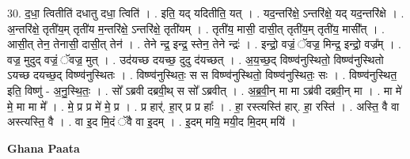 \documentclass[17pt]{extarticle}
\begin{document}
30. द॒धा॒ त्वितीति॑ दधातु दधा॒ त्विति॑ । . इति॒ यद् यदितीति॒ यत् । . यद॒न्तरि॑क्षे॒ ऽन्तरि॑क्षे॒ यद् यद॒न्तरि॑क्षे । . अ॒न्तरि॑क्षे॒ तृती॑य॒म् तृती॑य म॒न्तरि॑क्षे॒ ऽन्तरि॑क्षे॒ तृती॑यम् । . तृती॑य॒ मासी॒ दासी॒त् तृती॑य॒म् तृती॑य॒ मासी᳚त् । . आसी॒त् तेन॒ तेनासी॒ दासी॒त् तेन॑ । . तेने न्द्र॒ इन्द्र॒ स्तेन॒ तेने न्द्रः॑ । . इन्द्रो॒ वज्रं॒ ॅवज्र॒ मिन्द्र॒ इन्द्रो॒ वज्र᳚म् । . वज्र॒ मुदुद् वज्रं॒ ॅवज्र॒ मुत् । . उद॑यच्छ दयच्छ॒ दुदु द॑यच्छत् । . अ॒य॒च्छ॒द् विष्ण्व॑नुस्थितो॒ विष्ण्व॑नुस्थितो ऽयच्छ दयच्छ॒द् विष्ण्व॑नुस्थितः । . विष्ण्व॑नुस्थितः॒ स स विष्ण्व॑नुस्थितो॒ विष्ण्व॑नुस्थितः॒ सः । . विष्ण्व॑नुस्थित॒ इति॒ विष्णु॑ - अ॒नु॒स्थि॒तः॒ । . सो᳚ ऽब्रवी दब्रवी॒थ् स सो᳚ ऽब्रवीत् । . अ॒ब्र॒वी॒न् मा मा ऽब्र॑वी दब्रवी॒न् मा । . मा मे॑ मे॒ मा मा मे᳚ । . मे॒ प्र प्र मे॑ मे॒ प्र । . प्र हार्॑. हा॒र् प्र प्र हाः᳚ । . हा॒ रस्त्यस्ति॑ हार्. हा॒ रस्ति॑ । . अस्ति॒ वै वा अस्त्यस्ति॒ वै । . वा इ॒द मि॒दं ॅवै वा इ॒दम् । . इ॒दम् मयि॒ मयी॒द मि॒दम् मयि॑ । \newline

\textbf{Ghana Paata } \newline
\end{document}
